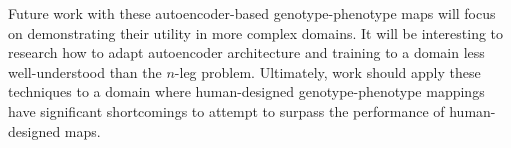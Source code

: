 Future work with these autoencoder-based genotype-phenotype maps will focus on demonstrating their utility in more complex domains.
It will be interesting to research how to adapt autoencoder architecture and training to a domain less well-understood than the $n$-leg problem.
Ultimately, work should apply these techniques to a domain where human-designed genotype-phenotype mappings have significant shortcomings to attempt to surpass the performance of human-designed maps.
